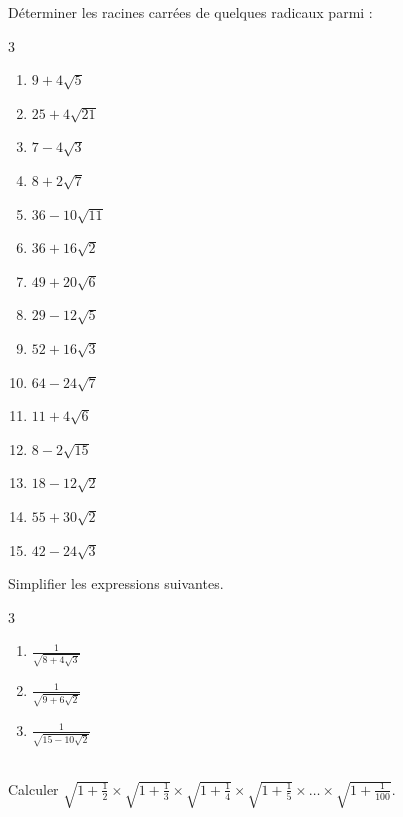 \documentclass[main.tex]{subfiles}
\begin{document}
\begin{exercise}[Entrainement] Déterminer les racines carrées de quelques radicaux parmi : 
	\vspace{-0.5em}
	\begin{multicols}{3} 
	\begin{enumerate}[label={$\Alph*=$},leftmargin=*] 
		\item 	$9+4\sqrt{5}$
		\item 	$25+4\sqrt{21}$
		\item 	$7-4\sqrt{3}$
		\item 	$8+2\sqrt{7}$
		\item 	$36-10\sqrt{11}$
		\item 	$36+16\sqrt{2}$
		\item 	$49+20\sqrt{6}$
		\item 	$29-12\sqrt{5}$
		\item 	$52+16\sqrt{3}$
		\item $64-24\sqrt{7}$
		\item $11+4\sqrt{6}$
		\item $8-2\sqrt{15}$
		\item $18-12\sqrt{2}$
		\item $55+30\sqrt{2}$
		\item $42-24\sqrt{3}$
	\end{enumerate}
	\end{multicols}	\vspace{-0.5em}
\end{exercise} 
\begin{exercise} Simplifier les expressions suivantes.	\vspace{-0.5em}
\begin{multicols}{3} 
	\begin{enumerate}[label={$\Alph*=$},leftmargin=*] 
	\item $\frac{1}{\sqrt{8+4\sqrt{3}}}$
	\item $\frac{1}{\sqrt{9+6\sqrt{2}}}$
	\item $\frac{1}{\sqrt{15-10\sqrt{2}}}$ 
\end{enumerate}\vspace{-0.5em}
\end{multicols}
\end{exercise}
\begin{exercise}\hfill \\
	 Calculer $\sqrt{1+\frac{1}{2}}\times 
	\sqrt{1+\frac{1}{3}}\times
	\sqrt{1+\frac{1}{4}}\times
	\sqrt{1+\frac{1}{5}}\times
	\ldots\times
	\sqrt{1+\frac{1}{100}}$.  
\end{exercise}
\end{document}
